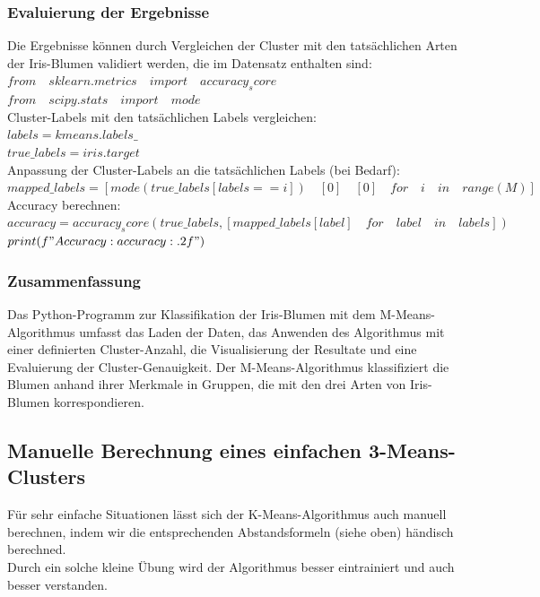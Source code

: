 \documentclass[12pt]{article}
\begin{document}
\subsubsection{Evaluierung der Ergebnisse}
%
Die Ergebnisse können durch Vergleichen der Cluster mit den tatsächlichen Arten der Iris-Blumen validiert werden, die im Datensatz enthalten sind: \\[0.2cm]
%
$ from\quad sklearn.metrics\quad import\quad accuracy_score $\\
$ from\quad scipy.stats\quad import\quad mode $ \\[0.2cm]
%
Cluster-Labels mit den tatsächlichen Labels vergleichen: \\[0.2cm]
$ labels = kmeans.labels\_  $ \\
$ true\_labels = iris.target $ \\[0.2cm]
%
Anpassung der Cluster-Labels an die tatsächlichen Labels (bei Bedarf): \\[0.2cm]
$ mapped\_labels =  [mode(true\_labels[labels == i])\quad [0]\quad [0]\quad for\quad i\quad in\quad range(M)] $ \\[0.2cm]
%
Accuracy berechnen:\\[0.2cm]
$ accuracy = accuracy_score(true\_labels, [mapped\_labels[label]\quad for\quad label\quad in\quad labels]) $   \\
$ print(f"Accuracy: {accuracy:.2f}")$ 

\subsubsection{Zusammenfassung}

Das Python-Programm zur Klassifikation der Iris-Blumen mit dem M-Means-Algorithmus umfasst das Laden der Daten, das Anwenden des Algorithmus mit einer definierten Cluster-Anzahl, die Visualisierung der Resultate und eine Evaluierung der Cluster-Genauigkeit. Der M-Means-Algorithmus klassifiziert die Blumen anhand ihrer Merkmale in Gruppen, die mit den drei Arten von Iris-Blumen korrespondieren.
\subsection{Manuelle Berechnung eines einfachen 3-Means-Clusters}
%
Für sehr einfache Situationen lässt sich der K-Means-Algorithmus auch manuell berechnen, indem  wir die entsprechenden Abstandsformeln (siehe oben) händisch berechned. \\
Durch ein solche kleine Übung wird der Algorithmus besser eintrainiert und auch besser verstanden.
\end{document}
